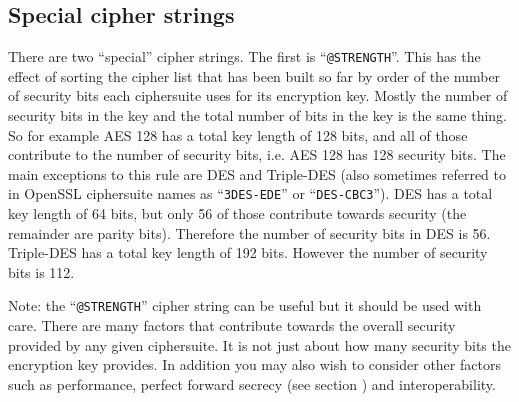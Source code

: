 \subsection{Special cipher strings}

There are two ``special'' cipher strings. The first is ``\verb!@STRENGTH!''. 
This has the effect of sorting the cipher list that has been built so far by 
order of the number of security bits each ciphersuite uses for its encryption 
key. Mostly the number of security bits in the key and the total number of bits
in the key is the same thing. So for example AES 128 has a total key length of
128 bits, and all of those contribute to the number of security bits, i.e. AES
128 has 128 security bits. The main exceptions to this rule are DES and
Triple-DES (also sometimes referred to in OpenSSL ciphersuite names as
``\verb!3DES-EDE!'' or ``\verb!DES-CBC3!''). DES has a total key length of 64
bits, but only 56 of those contribute towards security (the remainder are parity
bits). Therefore the number of security bits in DES is 56. Triple-DES has a
total key length of 192 bits. However the number of security bits is 112.

Note: the ``\verb!@STRENGTH!'' cipher string can be useful but it should be 
used with care. There are many factors that contribute towards the overall
security provided by any given ciphersuite. It is not just about how many
security bits the encryption key provides. In addition you may also wish to
consider other factors such as performance, perfect forward secrecy (see 
section ) and interoperability.

